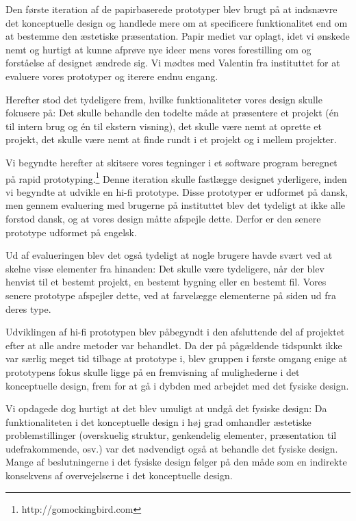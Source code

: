 Den første iteration af de papirbaserede prototyper blev brugt på at indsnævre det konceptuelle design og handlede mere om at specificere funktionalitet end om at bestemme den æstetiske præsentation. Papir mediet var oplagt, idet vi ønskede nemt og hurtigt at kunne afprøve nye ideer mens vores forestilling om og forståelse af designet ændrede sig. Vi mødtes med Valentin fra instituttet for at evaluere vores prototyper og iterere endnu engang. 

Herefter stod det tydeligere frem, hvilke funktionaliteter vores design skulle fokusere på: Det skulle behandle den todelte måde at præsentere et projekt (én til intern brug og én til ekstern visning), det skulle være nemt at oprette et projekt, det skulle være nemt at finde rundt i et projekt og i mellem projekter. 

Vi begyndte herefter at skitsere vores tegninger i et software program beregnet på rapid prototyping.\footnote{http://gomockingbird.com} Denne iteration skulle fastlægge designet yderligere, inden vi begyndte at udvikle en hi-fi prototype. Disse prototyper er udformet på dansk, men gennem evaluering med brugerne på instituttet blev det tydeligt at ikke alle forstod dansk, og at vores design måtte afspejle dette. Derfor er den senere prototype udformet på engelsk. 

Ud af evalueringen blev det også tydeligt at nogle brugere havde svært ved at skelne visse elementer fra hinanden: Det skulle være tydeligere, når der blev henvist til et bestemt projekt, en bestemt bygning eller en bestemt fil. Vores senere prototype afspejler dette, ved at farvelægge elementerne på siden ud fra deres type.

Udviklingen af hi-fi prototypen blev påbegyndt i den afsluttende del af projektet efter at alle andre metoder var behandlet. Da der på pågældende tidspunkt ikke var særlig meget tid tilbage at prototype i, blev gruppen i første omgang enige at prototypens fokus skulle ligge på en fremvisning af mulighederne i det konceptuelle design, frem for at gå i dybden med arbejdet med det fysiske design. 

Vi opdagede dog hurtigt at det blev umuligt at undgå det fysiske design: Da funktionaliteten i det konceptuelle design i høj grad omhandler æstetiske problemstillinger (overskuelig struktur, genkendelig elementer, præsentation til udefrakommende, osv.) var det nødvendigt også at behandle det fysiske design. Mange af beslutningerne i det fysiske design følger på den måde som en indirekte konsekvens af overvejelserne i det konceptuelle design.

